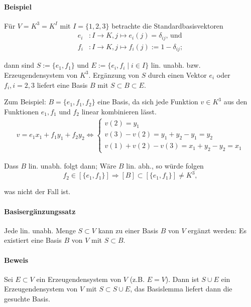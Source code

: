 \paragraph{Beispiel}
    Für $V=K^3=K^I$ mit $I=\{1,2,3\}$ betrachte die Standardbasisvektoren 
    \begin{align*}
        e_i &:I\to K, j\mapsto e_i(j) = \delta_{ij}\text{, und}\\
        f_i &: I\to K, j\mapsto f_i(j):= 1-\delta_{ij};
    \end{align*}

    dann sind $S:= \{e_1,f_1\}$ und $E:= \{e_i,f_i\mid i\in I\}$ lin. unabh. bzw. Erzeugendensystem von $K^3$. Ergänzung von $S$ durch einen Vektor $e_i$ oder $f_i, i = 2,3$ liefert eine Basis $B$ mit $S\subset B\subset E$.
    
    Zum Beispiel: $B=\{e_1,f_1,f_2\}$ eine Basis, da sich jede Funktion $v\in K^3$ aus den Funktionen $e_1,f_1$ und $f_2$ linear kombinieren lässt.
    \begin{gather*}
        v=e_1x_1+f_1y_1 + f_2y_2\Leftrightarrow \left\{
            \begin{array}{l}
                v(2)=y_1\\
                v(3) - v(2) = y_1 + y_2 - y_1 = y_2\\
                v(1) + v(2) - v(3) = x_1 + y_2 - y_2 = x_1
            \end{array}
    	\right.
    \end{gather*}

    Dass $B$ lin. unabh. folgt dann; Wäre $B$ lin. abh., so würde folgen
    \begin{equation*}
        f_2\in [\{e_1,f_1\}]\Rightarrow [B] \subset [\{e_1,f_1\}] \neq K^3,
    \end{equation*}

    was nicht der Fall ist.

\paragraph{Basisergänzungssatz}
    Jede lin. unabh. Menge $S\subset V$ kann zu einer Basis $B$ von $V$ ergänzt werden: Es existiert eine Basis $B$ von $V$ mit $S\subset B$.

\paragraph{Beweis}
    Sei $E\subset V$ ein Erzeugendensystem von $V$ (z.B. $E=V$). Dann ist $S\cup E$ ein Erzeugendensystem von $V$ mit $S\subset S\cup E$, das Basislemma liefert dann die gesuchte Basis.

